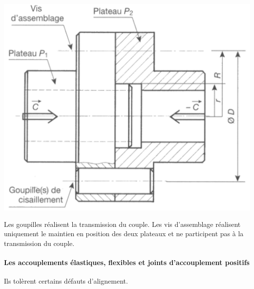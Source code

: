 \documentclass[11pt,oneside]{article}
\begin{document}
\begin{minipage}[c]{.4\linewidth}
\begin{center}
\includegraphics[width=.9\textwidth]{png/fig_10}
\end{center}
\end{minipage} \hfill
\begin{minipage}[c]{.55\linewidth}
Les goupilles réalisent la transmission du couple.
Les vis d’assemblage réalisent uniquement le maintien en position des deux plateaux et ne participent pas à la transmission du couple.
\end{minipage}

\paragraph{Les accouplements élastiques, flexibles et joints d’accouplement positifs}
Ils tolèrent certains défauts d’alignement.
\end{document}

